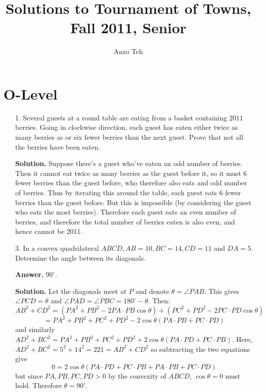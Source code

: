 \documentclass[11pt,a4paper]{article}
\begin{document}
	\newcommand{\la}{\leftarrow}
	\newcommand{\lra}{\leftrightarrow}
	\newcommand{\bbN}{\mathbb{N}}
	\newcommand{\bbZ}{\mathbb{Z}}
	\newcommand{\dsum}{\displaystyle\sum}
	\newcommand{\dprod}{\displaystyle\prod}
	
	
	\title{Solutions to Tournament of Towns, Fall 2011, Senior}
	\author{Anzo Teh}
	\date{}
	\maketitle
	
	\section*{O-Level}
	\begin{enumerate}
		\item[1.] Several guests at a round table are eating from a basket containing $2011$ berries. Going in clockwise direction, each guest has eaten either twice as many berries as or six fewer berries than the next guest. Prove that not all the berries have been eaten.
		
		\textbf{Solution.} Suppose there's a guest who've eaten an odd number of berries. Then it cannot eat twice as many berries as the guest before it, so it must 6 fewer berries than the guest before, who therefore also eats and odd number of berries. Thus by iterating this around the table, each guest eats 6 fewer berries than the guest before. But this is impossible (by considering the guest who eats the most berries). Therefore each guest eats an even number of berries, and therefore the total number of berries eaten is also even, and hence cannot be 2011. 
		
		\item[3.] In a convex quadrilateral $ABCD, AB = 10, BC = 14, CD = 11$ and $DA = 5$. Determine the angle between its diagonals.
		
		\textbf{Answer.} $90^{\circ}$. 
		
		\textbf{Solution.} Let the diagonals meet at $P$ and denote $\theta = \angle PAB$. This gives $\angle PCD=\theta$ and $\angle PAD=\angle PBC=180^{\circ}-\theta$. Then: 
		\[
		AB^2 + CD^2 = (PA^2+PB^2-2PA\cdot PB\cos\theta) + (PC^2+PD^2-2PC\cdot PD \cos\theta) 
		\]\[
		= PA^2+PB^2+PC^2+PD^2 - 2\cos\theta (PA\cdot PB + PC\cdot PD)
		\]
		and similarly $AD^2+BC^2 = PA^2+PB^2+PC^2+PD^2 + 2\cos\theta (PA\cdot PD + PC\cdot PB)$. Here, $AD^2+BC^2=5^2+14^2=221=AB^2+CD^2$ so subtracting the two equations give 
		\[
		0=2\cos\theta (PA\cdot PD + PC\cdot PB+PA\cdot PB + PC\cdot PD)
		\]
		but since $PA, PB, PC, PD>0$ by the convexity of $ABCD$, $\cos\theta=0$ must hold. Therefore $\theta=90^{\circ}$. 
		

\end{enumerate}
\end{document}
